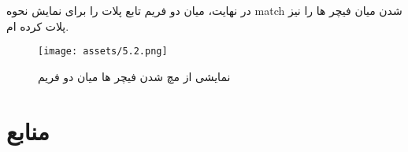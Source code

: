 \documentclass[a4paper,12pt]{article}
\begin{document}
در نهایت، میان دو فریم تابع پلات را برای نمایش نحوه match شدن میان فیچر ها را نیز پلات کرده ام.

\begin{figure}[h]
	\centering
	\texttt{[image: assets/5.2.png]}
	\caption{\textcolor{CustomAccent}{نمایشی از مچ شدن فیچر ها میان دو فریم}}
\end{figure}



\pagebreak

%	
	
	
\clearpage
\section*{منابع}

%
\end{document}
